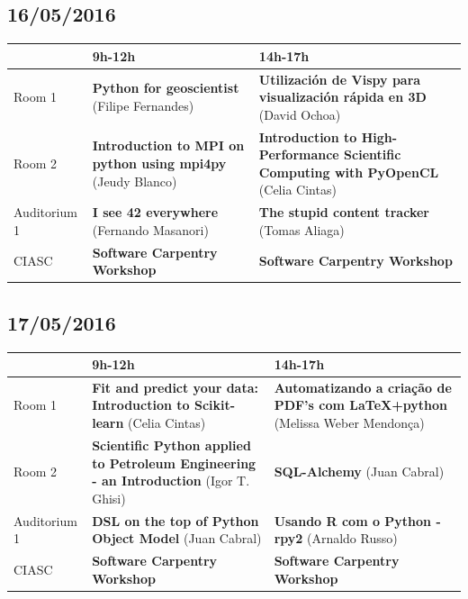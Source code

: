 \documentclass[12pt]{article}
\begin{document}
\newpage

\subsection*{16/05/2016}

\begin{center}
     \begin{tabular}{@{}l p{5cm} p{5cm}@{}}
     \toprule
      & 9h-12h & 14h-17h\\\midrule
     Room 1 & \textbf{Python for geoscientist} (Filipe Fernandes) & \textbf{Utilización de Vispy para visualización rápida en 3D} (David Ochoa)\\
     Room 2 & \textbf{Introduction to MPI on python using mpi4py} (Jeudy Blanco) & \textbf{Introduction to High-Performance Scientific Computing with PyOpenCL} (Celia Cintas)\\
     Auditorium 1 & \textbf{I see 42 everywhere} (Fernando Masanori) & \textbf{The stupid content tracker} (Tomas Aliaga)\\
     CIASC & \textbf{Software Carpentry Workshop} & \textbf{Software Carpentry Workshop} \\\bottomrule
     \end{tabular}

\subsection*{17/05/2016}

     \begin{tabular}{@{}l p{5cm} p{5cm}@{}}
     \toprule
      & 9h-12h & 14h-17h\\\midrule
     Room 1 & \textbf{Fit and predict your data: Introduction to Scikit-learn}
     (Celia Cintas) & \textbf{Automatizando a criação de PDF's com LaTeX+python} (Melissa Weber Mendonça)\\
     Room 2 & \textbf{Scientific Python applied to Petroleum Engineering - an
     Introduction} (Igor T. Ghisi) & \textbf{SQL-Alchemy} (Juan Cabral)\\
     Auditorium 1 & \textbf{DSL on the top of Python Object Model} (Juan Cabral) & \textbf{Usando R com o Python - rpy2} (Arnaldo Russo)\\
     CIASC & \textbf{Software Carpentry Workshop} & \textbf{Software Carpentry Workshop} \\\bottomrule
     \end{tabular}
\end{center}
\end{document}
